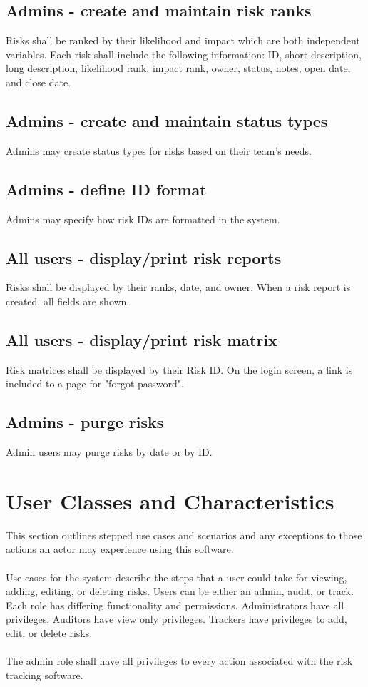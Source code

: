 \documentclass[letterpaper,12pt,oneside,listof=totoc]{scrreprt}
\begin{document}
\subsection{Admins - create and maintain risk ranks}
Risks shall be ranked by their likelihood and impact which are both independent variables. Each risk shall include the following information: ID, short description, long description, likelihood rank, impact rank, owner, status, notes, open date, and close date. 


\subsection{Admins - create and maintain status types}
Admins may create status types for risks based on their team's needs. 

\subsection{Admins - define ID format}
Admins may specify how risk IDs are formatted in the system. 

\subsection{All users - display/print risk reports}
Risks shall be displayed by their ranks, date, and owner. When a risk report is created, all fields are shown.

\subsection{All users - display/print risk matrix}
Risk matrices shall be displayed by their Risk ID. On the login screen, a link is included to a page for "forgot password".

\subsection{Admins - purge risks}
Admin users may purge risks by date or by ID. 


\section{User Classes and Characteristics}
    This section outlines stepped use cases and scenarios and any exceptions to those actions an actor may experience using this software.\\
    \\
    Use cases for the system describe the steps that a user could take for viewing, adding, editing, or deleting risks. Users can be either an admin, audit, or track. Each role has differing functionality and permissions. Administrators have all privileges. Auditors have view only privileges. Trackers have privileges to add, edit, or delete risks. \\
    \\
    The admin role shall have all privileges to every action associated with the risk tracking software.
\end{document}
